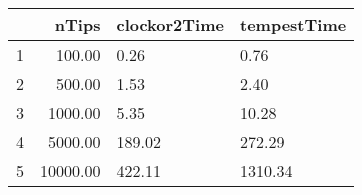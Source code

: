 \begin{table}[ht]
\centering
\begin{tabular}{rrll}
  \hline
 & nTips & clockor2Time & tempestTime \\ 
  \hline
1 & 100.00 & 0.26 & 0.76 \\ 
  2 & 500.00 & 1.53 & 2.40 \\ 
  3 & 1000.00 & 5.35 & 10.28 \\ 
  4 & 5000.00 & 189.02 & 272.29 \\ 
  5 & 10000.00 & 422.11 & 1310.34 \\ 
   \hline
\end{tabular}
\end{table}
